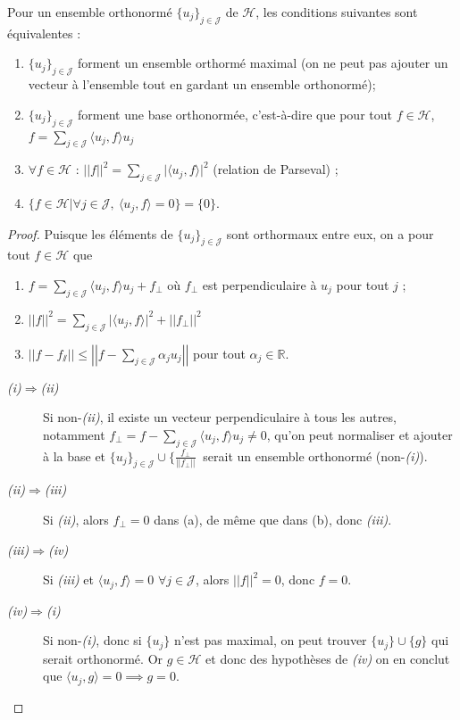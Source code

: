 \begin{theo}
    Pour un ensemble orthonormé $\{ u_j \}_{j\in\mathcal{J}}$ de $\mathcal{H}$, les conditions suivantes sont équivalentes :
    \begin{enumerate}[label=(\roman*)]
        \item $\{ u_j \}_{j\in\mathcal{J}}$ forment un ensemble orthormé maximal (on ne peut pas ajouter un vecteur à l'ensemble tout en gardant un ensemble orthonormé);
        \item $\{ u_j \}_{j\in\mathcal{J}}$ forment une base orthonormée, c'est-à-dire que pour tout $f\in\mathcal{H}$, $f = \sum_{j\in\mathcal{J}} \langle u_j,f \rangle u_j$
        \item $\forall f\in\mathcal{H}$ : $||f||^2 = \sum_{j\in\mathcal{J}} \big| \langle u_j,f \rangle \big|^2$ (relation de Parseval) ;
        \item $\{f\in\mathcal{H}\big|\forall j\in\mathcal{J}, \ \langle u_j,f \rangle = 0\} = \{0\}$.
    \end{enumerate} \label{theo:ens_ortho}
\end{theo}
\begin{proof}
    Puisque les éléments de $\{ u_j \}_{j\in\mathcal{J}}$ sont orthormaux entre eux, on a pour tout $f\in\mathcal{H}$ que
    \begin{enumerate}[label=(\alph*)]
        \item $f = \sum_{j\in\mathcal{J}} \langle u_j,f \rangle u_j + f_\bot$ où $f_\bot$ est perpendiculaire à $u_j$ pour tout $j$ ;
        \item $||f||^2 = \sum_{j\in\mathcal{J}} \big|\langle u_j,f \rangle\big|^2 + ||f_\bot||^2$
        \item $||f-f_\sslash|| \leq \left|\left| f - \sum_{j\in\mathcal{J}}\alpha_j u_j \right|\right|$ pour tout $\alpha_j\in\mathbb{R}$.
    \end{enumerate}
    \begin{description}
        \item[\textit{(i)$\Rightarrow$(ii)}] Si non-\textit{(ii)}, il existe un vecteur perpendiculaire à tous les autres, notamment $f_\bot = f-\sum_{j\in\mathcal{J}}\langle u_j, f\rangle u_j \neq 0$, qu'on peut normaliser et ajouter à la base et $\{u_j\}_{j\in\mathcal{J}} \cup \{\frac{f_\bot}{||f_\bot||}\ $ serait un ensemble orthonormé (non-\textit{(i)}).
        \item[\textit{(ii)$\Rightarrow$(iii)}] Si \textit{(ii)}, alors $f_\bot = 0$ dans (a), de même que dans (b), donc \textit{(iii)}.
        \item[\textit{(iii)$\Rightarrow$(iv)}] Si \textit{(iii)} et $\langle u_j,f \rangle = 0$ $\forall j\in\mathcal{J}$, alors $||f||^2 = 0$, donc $f=0$.
        \item[\textit{(iv)$\Rightarrow$(i)}] Si non-\textit{(i)}, donc si $\{u_j\}$ n'est pas maximal, on peut trouver $\{u_j\}\cup\{g\}$ qui serait orthonormé. Or $g\in \mathcal{H}$ et donc des hypothèses de \textit{(iv)} on en conclut que $\langle u_j,g\rangle = 0 \implies g = 0$.
    \end{description}
\end{proof}

